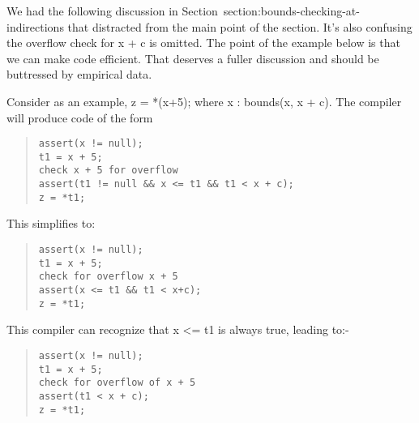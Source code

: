 We had the following discussion in Section~{section:bounds-checking-at-indirections}
that distracted from the
main point of the section. It's also confusing the overflow check for x
+ c is omitted. The point of the example below is that we can make code
efficient. That deserves a fuller discussion and should be buttressed by
empirical data.

Consider as an example, z = *(x+5); where x : bounds(x, x + c). The
compiler will produce code of the form

\begin{quote}
\begin{verbatim}
assert(x != null);
t1 = x + 5;
check x + 5 for overflow
assert(t1 != null && x <= t1 && t1 < x + c);
z = *t1;
\end{verbatim}
\end{quote}

This simplifies to:

\begin{quote}
\begin{verbatim}
assert(x != null);
t1 = x + 5;
check for overflow x + 5
assert(x <= t1 && t1 < x+c);
z = *t1;
\end{verbatim}
\end{quote}

This compiler can recognize that x \textless{}= t1 is always true,
leading to:-

\begin{quote}
\begin{verbatim}
assert(x != null);
t1 = x + 5;
check for overflow of x + 5
assert(t1 < x + c);
z = *t1;
\end{verbatim}
\end{quote}